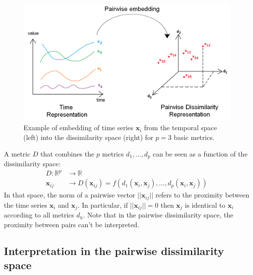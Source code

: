 \begin{figure}[h!]
	\begin{minipage}[b]{1.0\linewidth}
		\centering
		\includegraphics[width=0.85\linewidth]{images/PairwiseEmbedding2}
	\end{minipage}
	\caption{Example of embedding of time series $\textbf{x}_i$ from the temporal space (left) into the dissimilarity space (right) for $p=3$ basic metrics.}
	\label{fig:PairwiseEmbedding}
\end{figure}

\noindent A metric $D$ that combines the $p$ metrics $d_1, \ldots, d_p$ can be seen as a function of the dissimilarity space:
\begin{equation}
\begin{aligned}
D : \mathbb{R}^p & \rightarrow \mathbb{R} \\
\textbf{x}_{ij} & \rightarrow D(\textbf{x}_{ij}) = f(d_1(\textbf{x}_i, \textbf{x}_j), \ldots , d_p(\textbf{x}_i, \textbf{x}_j))
\end{aligned}
\label{eq:metric}
\end{equation}
In that space, the norm of a pairwise vector $||\textbf{x}_{ij}||$ refers to the proximity between the time series $\textbf{x}_i$ and $\textbf{x}_j$. In particular, if $||\textbf{x}_{ij}||=0$ then $\textbf{x}_j$ is identical to $\textbf{x}_i$ according to all metrics $d_h$. Note that in the pairwise dissimilarity space, the proximity between pairs can't be interpreted.

\subsection{Interpretation in the pairwise dissimilarity space}

